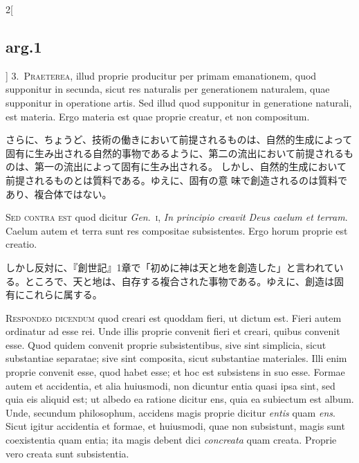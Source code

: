 \documentclass[paper=a4paper,fontsize=10pt,jafontsize=9pt,titlepage]{jlreq}
\begin{document}
\begin{paracol}{2}[\subsection{arg.1}]
3.~{\scshape Praeterea}, illud proprie producitur per
primam emanationem, quod supponitur in secunda, sicut res naturalis per
generationem naturalem, quae supponitur in operatione artis. Sed illud
quod supponitur in generatione naturali, est materia. Ergo materia est
quae proprie creatur, et non compositum.

\switchcolumn

さらに、ちょうど、技術の働きにおいて前提されるものは、自然的生成によって
 固有に生み出される自然的事物であるように、第二の流出において前提されるも
 のは、第一の流出によって固有に生み出される。
しかし、自然的生成において前提されるものとは質料である。ゆえに、固有の意
 味で創造されるのは質料であり、複合体ではない。

\switchcolumn*[\subsection{s.c.}]

{\scshape Sed contra est} quod dicitur {\itshape Gen}.~{\scshape i},
{\itshape In principio creavit Deus caelum et terram}. Caelum autem et
terra sunt res compositae subsistentes. Ergo horum proprie est creatio.

\switchcolumn

しかし反対に、『創世記』1章で「初めに神は天と地を創造した」と言われてい
 る。ところで、天と地は、自存する複合された事物である。ゆえに、創造は固
 有にこれらに属する。


{\scshape Respondeo dicendum} quod creari est quoddam fieri, ut dictum
est. Fieri autem ordinatur ad esse rei. Unde illis proprie convenit
fieri et creari, quibus convenit esse. Quod quidem convenit proprie
subsistentibus, sive sint simplicia, sicut substantiae separatae; sive
sint composita, sicut substantiae materiales. Illi enim proprie convenit
esse, quod habet esse; et hoc est subsistens in suo esse. Formae autem
et accidentia, et alia huiusmodi, non dicuntur entia quasi ipsa sint,
sed quia eis aliquid est; ut albedo ea ratione dicitur ens, quia ea
subiectum est album. Unde, secundum philosophum, accidens magis proprie
dicitur {\itshape entis} quam {\itshape ens}. Sicut igitur accidentia et
formae, et huiusmodi, quae non subsistunt, magis sunt coexistentia quam
entia; ita magis debent dici {\itshape concreata} quam creata. Proprie
vero creata sunt subsistentia.


\end{paracol}
\end{document}
